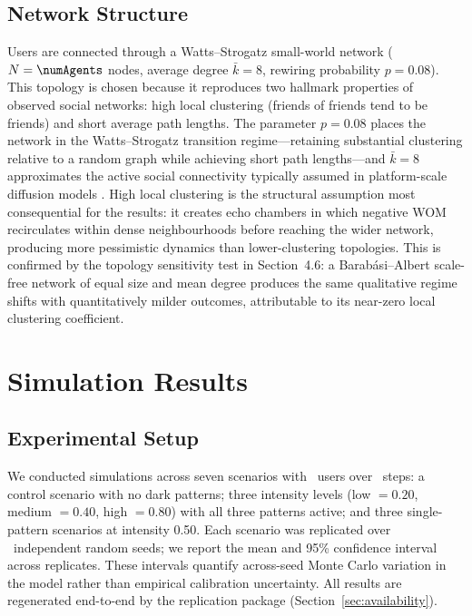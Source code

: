 \documentclass[a4paper,fleqn]{cas-sc}
\begin{document}
\subsection{Network Structure}
Users are connected through a Watts--Strogatz small-world network ($N=\numAgents$ nodes, average degree $\bar{k}=8$, rewiring probability $p=0.08$). This topology is chosen because it reproduces two hallmark properties of observed social networks: high local clustering (friends of friends tend to be friends) and short average path lengths. The parameter $p=0.08$ places the network in the Watts--Strogatz transition regime---retaining substantial clustering relative to a random graph while achieving short path lengths---and $\bar{k}=8$ approximates the active social connectivity typically assumed in platform-scale diffusion models \citep{goldenberg2001}. High local clustering is the structural assumption most consequential for the results: it creates echo chambers in which negative WOM recirculates within dense neighbourhoods before reaching the wider network, producing more pessimistic dynamics than lower-clustering topologies. This is confirmed by the topology sensitivity test in Section~4.6: a Barab\'asi--Albert scale-free network of equal size and mean degree produces the same qualitative regime shifts with quantitatively milder outcomes, attributable to its near-zero local clustering coefficient.

\section{Simulation Results}
\subsection{Experimental Setup}
We conducted simulations across seven scenarios with \numAgents\ users over \maxSteps\ steps: a control scenario with no dark patterns; three intensity levels (low $=0.20$, medium $=0.40$, high $=0.80$) with all three patterns active; and three single-pattern scenarios at intensity 0.50. Each scenario was replicated over \numReplicates\ independent random seeds; we report the mean and 95\% confidence interval across replicates. These intervals quantify across-seed Monte Carlo variation in the model rather than empirical calibration uncertainty. All results are regenerated end-to-end by the replication package (Section~\ref{sec:availability}).
\end{document}
